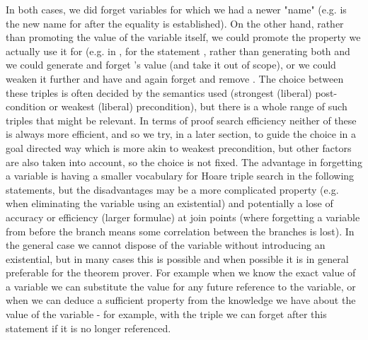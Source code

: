 \begin{itemize}
	In both cases, we did forget variables for which we had a newer "name" (e.g.  is the new name for  after the equality is established).
		On the other hand, rather than promoting the value of the variable itself, we could promote the property we actually use it for (e.g. in , for the statement , rather than generating both  and   we could generate  and forget 's value (and take it out of scope), or we could weaken it further and have  and again forget and remove .
		The choice between these triples is often decided by the semantics used (strongest (liberal) post-condition or weakest (liberal) precondition), but there is a whole range of such triples that might be relevant.
		In terms of proof search efficiency neither of these is always more efficient, and so we try, in a later section, to guide the choice in a goal directed way which is more akin to weakest precondition, but other factors are also taken into account, so the choice is not fixed.
		The advantage in forgetting a variable is having a smaller vocabulary for Hoare triple search in the following statements, but the disadvantages may be a more complicated property (e.g. when eliminating the variable using an existential) and potentially a lose of accuracy or efficiency (larger formulae) at join points (where forgetting a variable from before the branch means some correlation between the branches is lost).
		In the general case we cannot dispose of the variable without introducing an existential, but in many cases this is possible and when possible it is in general preferable for the theorem prover.
		For example when we know the exact value of a variable we can substitute the value for any future reference to the variable, or when we can deduce a sufficient property from the knowledge we have about the value of the variable - for example, with the triple   we can forget  after this statement if it is no longer referenced.


\end{itemize}
